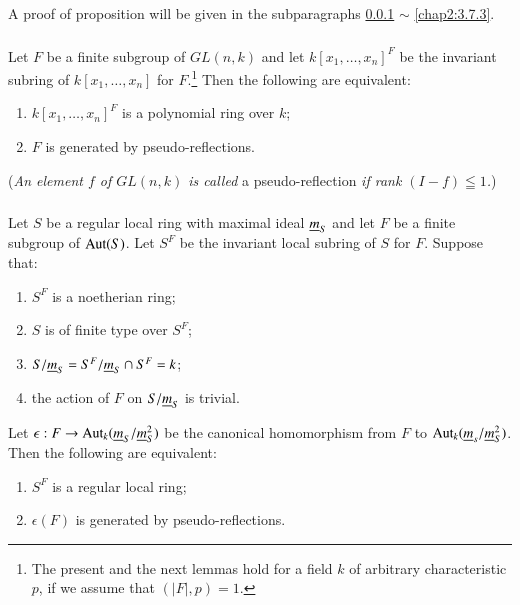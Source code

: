 A proof of proposition will be given in the subparagraphs \ref{chap2:3.7.1}
$\sim$ \ref{chap2:3.7.3}.

\subsubsection{}\label{chap2:3.7.1}
\begin{lemma*}[(Serre {[53; Th.1]}) ]
  Let $F$ be a finite subgroup of $GL(n,k)$ and let
  $k[x_{1},\ldots,x_{n}]^{F}$ be the invariant subring of
  $k[x_{1},\ldots,x_{n}]$ for $F$.\footnote{The present and the next
    lemmas hold for a field $k$ of arbitrary characteristic $p$, if we
    assume that $(|F|,p)=1$.} Then the following are equivalent:
  \begin{enumerate}
    \renewcommand{\labelenumi}{\rm(\theenumi)}
  \item $k[x_{1},\ldots,x_{n}]^{F}$ is a polynomial ring over $k$;
    
  \item $F$ is generated by pseudo-reflections.
  \end{enumerate}
  ({\em An element $f$ of $GL(n,k)$ is called } a pseudo-reflection {\em
    if rank $(I-f)\leqq 1$.})
\end{lemma*}

\subsubsection{}\label{chap2:3.7.2}
\begin{lemma*}[(Serre {[53; Th.1']}) ]
  Let $S$ be a regular local ring with maximal ideal $\underline{m}_{S}$ and
  let $F$ be a finite subgroup of $\operatorname{Aut}(S)$. Let $S^{F}$ be the
  invariant local subring of $S$ for $F$. Suppose that:
  \begin{enumerate}
    \renewcommand{\labelenumi}{\rm(\theenumi)}
  \item $S^{F}$ is a noetherian ring;
    
  \item $S$ is of finite type over $S^{F}$;
    
  \item $S/\underline{m}_{S}=S^{F}/\underline{m}_{S}\cap S^{F}=k$;\pageoriginale\
    
  \item the action of $F$ on $S/\underline{m}_{S}$ is trivial.
  \end{enumerate}
  Let $\epsilon:F\to \operatorname{Aut}_{k}(\underline{m}_{S}/\underline{m}^{2}_{S})$ be the
  canonical homomorphism from $F$ to
  $\operatorname{Aut}_{k}(\underline{m}_s/\underline{m}^{2}_{S})$. Then the following are equivalent:
  \begin{enumerate}
    \renewcommand{\theenumi}{\roman{enumi}}
    \renewcommand{\labelenumi}{\rm(\theenumi)}
  \item $S^{F}$ is a regular local ring;
    
  \item $\epsilon(F)$ is generated by pseudo-reflections.
  \end{enumerate}
\end{lemma*}

